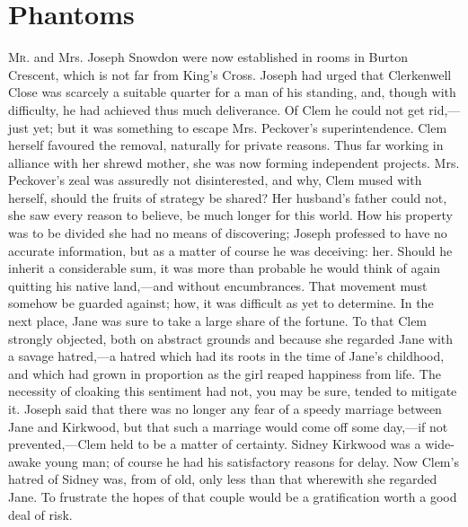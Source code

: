 \chapter{Phantoms}

\textsc{Mr.} and Mrs. Joseph Snowdon were now established in rooms in
Burton Crescent, which is not far from King's Cross. Joseph had urged
that Clerkenwell Close was scarcely a suitable quarter for a man of his
standing, and, though with difficulty, he had achieved thus much
deliverance. Of Clem he could not get rid,---just yet; but it was
something to escape Mrs. Peckover's superintendence. Clem herself
favoured the removal, naturally for private reasons. Thus far working in
alliance with her shrewd mother, she was now forming independent
projects. Mrs. Peckover's zeal was assuredly not disinterested, and why,
Clem mused with herself, should the fruits of strategy be shared? Her
husband's father could not, she saw every reason to believe, be much
longer for this world. How his property {}was to be divided she had no
means of discovering; Joseph professed to have no accurate information,
but as a matter of course he was deceiving: her. Should he inherit a
considerable sum, it was more than probable he would think of again
quitting his native land,---and without encumbrances. That movement must
somehow be guarded against; how, it was difficult as yet to determine.
In the next place, Jane was sure to take a large share of the fortune.
To that Clem strongly objected, both on abstract grounds and because she
regarded Jane with a savage hatred,---a hatred which had its roots in
the time of Jane's childhood, and which had grown in proportion as the
girl reaped happiness from life. The necessity of cloaking this
sentiment had not, you may be sure, tended to mitigate it. Joseph said
that there was no longer any fear of a speedy marriage between Jane and
Kirkwood, but that such a marriage would come off some day,---if not
prevented,---Clem held to be a matter of certainty. Sidney Kirkwood was
a wide-awake young man; of course he had his satisfactory reasons for
delay. Now Clem's hatred of Sidney was, from of old, only less than that
{}wherewith she regarded Jane. To frustrate the hopes of that couple
would be a gratification worth a good deal of risk.

